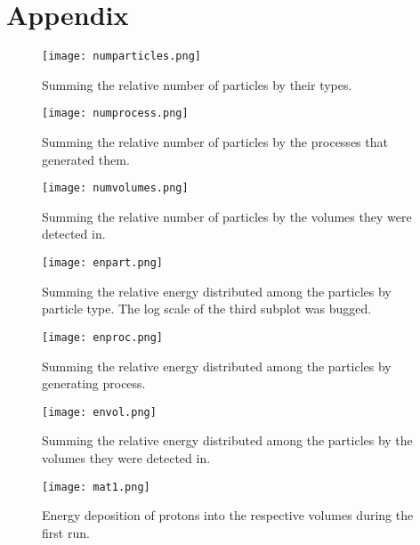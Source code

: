 \documentclass[12pt,twocolumn]{article}
\begin{document}
\section*{Appendix}

\begin{figure}[H]
    \centering
    \texttt{[image: numparticles.png]}
    \caption{Summing the relative number of particles by their types.}
    \label{fig:my_label}
\end{figure}

\begin{figure}[H]
    \centering
    \texttt{[image: numprocess.png]}
    \caption{Summing the relative number of particles by the processes that generated them.}
    \label{fig:my_label}
\end{figure}

\begin{figure}[H]
    \centering
    \texttt{[image: numvolumes.png]}
    \caption{Summing the relative number of particles by the volumes they were detected in.}
    \label{fig:my_label}
\end{figure}

\begin{figure}[H]
    \centering
    \texttt{[image: enpart.png]}
    \caption{Summing the relative energy distributed among the particles by particle type. The log scale of the third subplot was bugged.}
    \label{fig:my_label}
\end{figure}

\begin{figure}[H]
    \centering
    \texttt{[image: enproc.png]}
    \caption{Summing the relative energy distributed among the particles by generating process.}
    \label{fig:my_label}
\end{figure}

\begin{figure}[H]
    \centering
    \texttt{[image: envol.png]}
    \caption{Summing the relative energy distributed among the particles by the volumes they were detected in.}
    \label{fig:my_label}
\end{figure}

\begin{figure}[H]
    \centering
    \texttt{[image: mat1.png]}
    \caption{Energy deposition of protons into the respective volumes during the first run.}
    \label{fig:my_label}
\end{figure}
\end{document}

